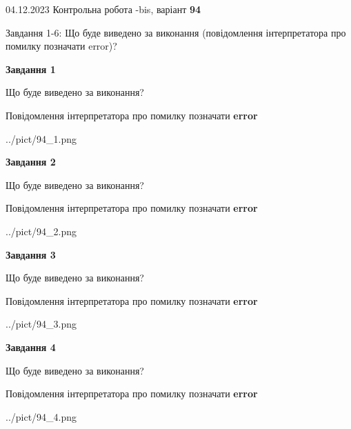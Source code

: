\documentclass[12pt, ukrainian]{article}
\begin{document}
{{04.12.2023 Контрольна робота -bis, варіант  \No \textbf { 94 }\par}}
{

Завдання 1-6: Що буде виведено за виконання (повідомлення інтерпретатора про помилку позначати error)?


{\begin {center}\textbf{Завдання 1}\end {center}}\par
Що буде виведено за виконання? \par
Повідомлення інтерпретатора про помилку позначати \textbf{error}

\begin{center}
	{../pict/94_1.png}
\end{center}
\newpage

{\begin {center}\textbf{Завдання 2}\end {center}}\par
Що буде виведено за виконання? \par
Повідомлення інтерпретатора про помилку позначати \textbf{error}

\begin{center}
	{../pict/94_2.png}
\end{center}
\newpage

{\begin {center}\textbf{Завдання 3}\end {center}}\par
Що буде виведено за виконання? \par
Повідомлення інтерпретатора про помилку позначати \textbf{error}

\begin{center}
	{../pict/94_3.png}
\end{center}
\newpage

{\begin {center}\textbf{Завдання 4}\end {center}}\par
Що буде виведено за виконання? \par
Повідомлення інтерпретатора про помилку позначати \textbf{error}

\begin{center}
	{../pict/94_4.png}
\end{center}
\newpage

}
\end{document}
